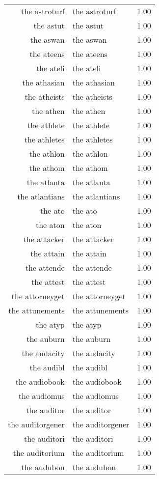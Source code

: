 \begin{table}[ht]
\begin{tabular}{rlr}
  the astroturf & the astroturf & 1.00 \\ 
  the astut & the astut & 1.00 \\ 
  the aswan & the aswan & 1.00 \\ 
  the ateens & the ateens & 1.00 \\ 
  the ateli & the ateli & 1.00 \\ 
  the athasian & the athasian & 1.00 \\ 
  the atheists & the atheists & 1.00 \\ 
  the athen & the athen & 1.00 \\ 
  the athlete & the athlete & 1.00 \\ 
  the athletes & the athletes & 1.00 \\ 
  the athlon & the athlon & 1.00 \\ 
  the athom & the athom & 1.00 \\ 
  the atlanta & the atlanta & 1.00 \\ 
  the atlantians & the atlantians & 1.00 \\ 
  the ato & the ato & 1.00 \\ 
  the aton & the aton & 1.00 \\ 
  the attacker & the attacker & 1.00 \\ 
  the attain & the attain & 1.00 \\ 
  the attende & the attende & 1.00 \\ 
  the attest & the attest & 1.00 \\ 
  the attorneyget & the attorneyget & 1.00 \\ 
  the attunements & the attunements & 1.00 \\ 
  the atyp & the atyp & 1.00 \\ 
  the auburn & the auburn & 1.00 \\ 
  the audacity & the audacity & 1.00 \\ 
  the audibl & the audibl & 1.00 \\ 
  the audiobook & the audiobook & 1.00 \\ 
  the audiomus & the audiomus & 1.00 \\ 
  the auditor & the auditor & 1.00 \\ 
  the auditorgener & the auditorgener & 1.00 \\ 
  the auditori & the auditori & 1.00 \\ 
  the auditorium & the auditorium & 1.00 \\ 
  the audubon & the audubon & 1.00 \\ 

\end{tabular}
\end{table}
